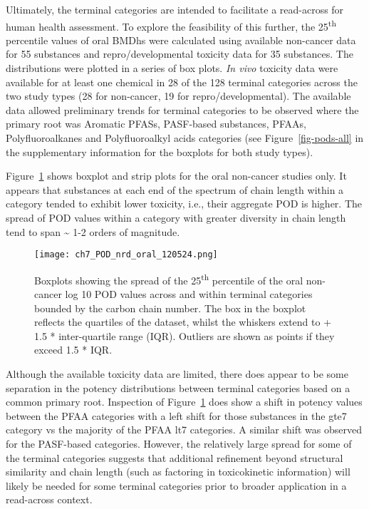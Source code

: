 \documentclass[
  super,
  preprint,
  3p]{elsarticle}
\begin{document}
Ultimately, the terminal categories are intended to facilitate a
read-across for human health assessment. To explore the feasibility of
this further, the 25\textsuperscript{th} percentile values of oral BMDhs
were calculated using available non-cancer data for 55 substances and
repro/developmental toxicity data for 35 substances. The distributions
were plotted in a series of box plots. \emph{In vivo} toxicity data were
available for at least one chemical in 28 of the 128 terminal categories
across the two study types (28 for non-cancer, 19 for
repro/developmental). The available data allowed preliminary trends for
terminal categories to be observed where the primary root was Aromatic
PFASs, PASF-based substances, PFAAs, Polyfluoroalkanes and
Polyfluoroalkyl acids categories (see Figure~\ref{fig-pods-all} in the
supplementary information for the boxplots for both study types).

Figure~\ref{fig-pods-oral} shows boxplot and strip plots for the oral
non-cancer studies only. It appears that substances at each end of the
spectrum of chain length within a category tended to exhibit lower
toxicity, i.e., their aggregate POD is higher. The spread of POD values
within a category with greater diversity in chain length tend to span
\textasciitilde{} 1-2 orders of magnitude.

\begin{figure}

{\centering \texttt{[image: ch7\_POD\_nrd\_oral\_120524.png]}

}

\caption{\label{fig-pods-oral}Boxplots showing the spread of the
25\textsuperscript{th} percentile of the oral non-cancer log 10 POD
values across and within terminal categories bounded by the carbon chain
number. The box in the boxplot reflects the quartiles of the dataset,
whilst the whiskers extend to + 1.5 * inter-quartile range (IQR).
Outliers are shown as points if they exceed 1.5 * IQR.}

\end{figure}

Although the available toxicity data are limited, there does appear to
be some separation in the potency distributions between terminal
categories based on a common primary root. Inspection of
Figure~\ref{fig-pods-oral} does show a shift in potency values between
the PFAA categories with a left shift for those substances in the gte7
category vs the majority of the PFAA lt7 categories. A similar shift was
observed for the PASF-based categories. However, the relatively large
spread for some of the terminal categories suggests that additional
refinement beyond structural similarity and chain length (such as
factoring in toxicokinetic information) will likely be needed for some
terminal categories prior to broader application in a read-across
context.
\end{document}
